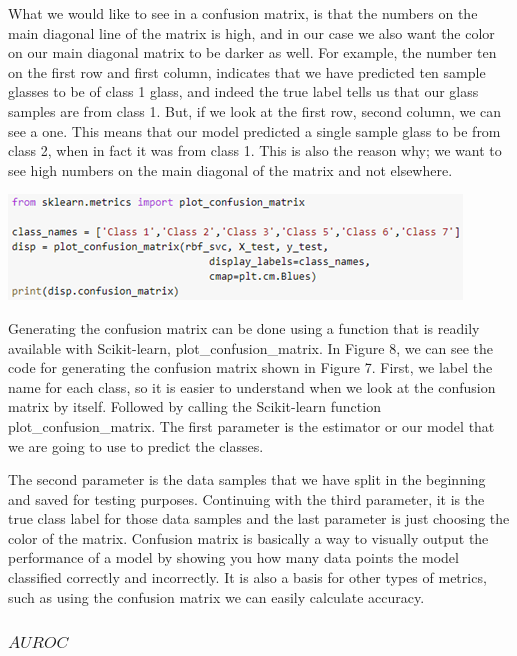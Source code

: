 \documentclass[a4paper,12pt]{report}
\begin{document}
What we would like to see in a confusion matrix, is that the numbers on the main diagonal line of the matrix is high, and in our case we also want the color on our main diagonal matrix to be darker as well. For example, the number ten on the first row and first column, indicates that we have predicted ten sample glasses to be of class 1 glass, and indeed the true label tells us that our glass samples are from class 1. But, if we look at the first row, second column, we can see a one. This means that our model predicted a single sample glass to be from class 2, when in fact it was from class 1. This is also the reason why; we want to see high numbers on the main diagonal of the matrix and not elsewhere.

\begin{center}
    \captionsetup{type=figure}
    \includegraphics[width=.9\linewidth]{media/ConfusionMatrixCode.png}
\end{center}

Generating the confusion matrix can be done using a function that is readily available with Scikit-learn, plot\_confusion\_matrix. In Figure 8, we can see the code for generating the confusion matrix shown in Figure 7. First, we label the name for each class, so it is easier to understand when we look at the confusion matrix by itself. Followed by calling the Scikit-learn function plot\_confusion\_matrix. The first parameter is the estimator or our model that we are going to use to predict the classes.

The second parameter is the data samples that we have split in the beginning and saved for testing purposes. Continuing with the third parameter, it is the true class label for those data samples and the last parameter is just choosing the color of the matrix. Confusion matrix is basically a way to visually output the performance of a model by showing you how many data points the model classified correctly and incorrectly. It is also a basis for other types of metrics, such as using the confusion matrix we can easily calculate accuracy.

\subsubsection{$AUROC$}
\end{document}
